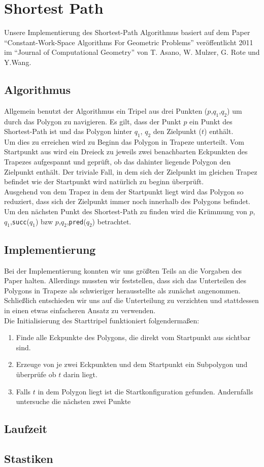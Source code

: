 \section{Shortest Path}
	
Unsere Implementierung des Shortest-Path Algorithmus basiert auf dem Paper \enquote{Constant-Work-Space Algorithms For Geometric Problems} veröffentlicht 2011 im \enquote{Journal of Computational Geometry} von T. Asano, W. Mulzer, G. Rote und Y.Wang. 

\subsection{Algorithmus}

Allgemein benutzt der Algorithmus ein Tripel aus drei Punkten ($p$,$q_1$,$q_2$) um durch das Polygon zu navigieren. Es gilt, dass der Punkt $p$ ein Punkt des Shortest-Path ist und das Polygon hinter $q_1$, $q_2$ den Zielpunkt ($t$) enthält.\\
Um dies zu erreichen wird zu Beginn das Polygon in Trapeze unterteilt. Vom Startpunkt aus wird ein Dreieck zu jeweils zwei benachbarten Eckpunkten des Trapezes aufgespannt und geprüft, ob das dahinter liegende Polygon den Zielpunkt enthält. Der triviale Fall, in dem sich der Zielpunkt im gleichen Trapez befindet wie der Startpunkt wird natürlich zu beginn überprüft.\\
Ausgehend von dem Trapez in dem der Startpunkt liegt wird das Polygon so reduziert, dass sich der Zielpunkt immer noch innerhalb des Polygons befindet. Um den nächsten Punkt des Shortest-Path zu finden wird die Krümmung von $p$,$q_1$,\texttt{succ}($q_1$) bzw $p$,$q_2$,\texttt{pred}($q_2$) betrachtet.

\subsection{Implementierung}

Bei der Implementierung konnten wir uns größten Teils an die Vorgaben des Paper halten. Allerdings mussten wir feststellen, dass sich das Unterteilen des Polygons in Trapeze als schwieriger herausstellte als zunächst angenommen. Schließlich entschieden wir uns auf die Unterteilung zu verzichten und stattdessen in einen etwas einfacheren Ansatz zu verwenden.\\
Die Initialisierung des Starttripel funktioniert folgendermaßen:

\begin{enumerate}
\item Finde alle Eckpunkte des Polygons, die direkt vom Startpunkt aus sichtbar sind.
\item Erzeuge von je zwei Eckpunkten und dem Startpunkt ein Subpolygon und überprüfe ob $t$ darin liegt.
\item Falls $t$ in dem Polygon liegt ist die Startkonfiguration gefunden. Andernfalls untersuche die nächsten zwei Punkte
\end{enumerate}

\subsection{Laufzeit}
\subsection{Stastiken}